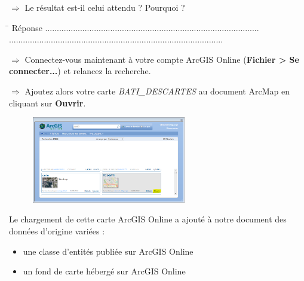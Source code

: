 \documentclass[11pt]{article}
\newcommand{\action}{$\Rightarrow$ }
\newcommand{\reponse}{
	\begin{tabbing}
	\hspace{2cm}\=\kill
	Réponse \> ............................................................................................ \\
 	\> ............................................................................................
	\end{tabbing}
}
\begin{document}
\action Le résultat est-il celui attendu ? Pourquoi ?

\reponse

\action Connectez-vous maintenant à votre compte ArcGIS Online (\textbf{Fichier > Se connecter...}) et relancez la recherche.

\action Ajoutez alors votre carte \textit{BATI\_DESCARTES} au document ArcMap en cliquant sur \textbf{Ouvrir}.
\begin{figure}[H]
	\center \includegraphics[width=0.6\textwidth]{img/cours3/am_ouvrir_service_ago.png} \\
\end{figure}

Le chargement de cette carte ArcGIS Online a ajouté à notre document des données d'origine variées :
\begin{itemize}
	\item une classe d'entités publiée sur ArcGIS Online
	\item un fond de carte hébergé sur ArcGIS Online
\end{itemize}

%
%
%
%
%
%
%
%
\end{document}
